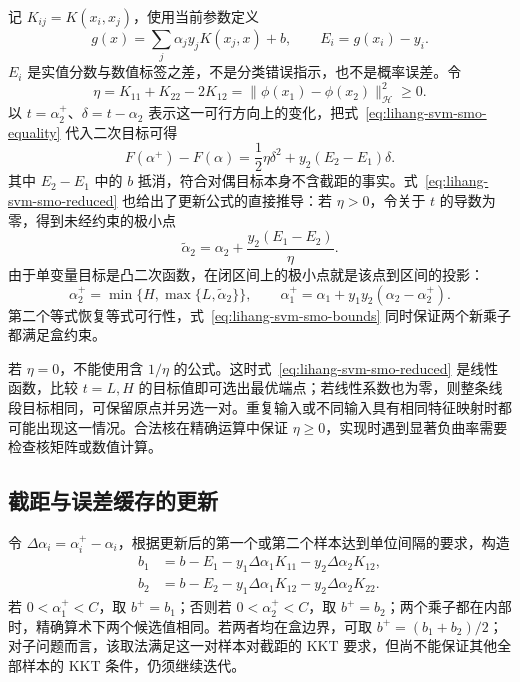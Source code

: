 记 $K_{ij}=K(x_i,x_j)$，使用当前参数定义
\begin{equation}
  g(x)=\sum_j\alpha_j y_jK(x_j,x)+b,
  \qquad E_i=g(x_i)-y_i.
  \label{eq:lihang-svm-smo-error}
\end{equation}
$E_i$ 是实值分数与数值标签之差，不是分类错误指示，也不是概率误差。令
\begin{equation}
  \eta=K_{11}+K_{22}-2K_{12}
       =\lVert\phi(x_1)-\phi(x_2)\rVert_{\mathcal H}^2\ge0.
  \label{eq:lihang-svm-smo-curvature}
\end{equation}
以 $t=\alpha_2^+$、$\delta=t-\alpha_2$ 表示这一可行方向上的变化，把式~\eqref{eq:lihang-svm-smo-equality} 代入二次目标可得
\begin{equation}
  F(\alpha^+)-F(\alpha)
      =\frac12\eta\delta^2+y_2(E_2-E_1)\delta.
  \label{eq:lihang-svm-smo-reduced}
\end{equation}
其中 $E_2-E_1$ 中的 $b$ 抵消，符合对偶目标本身不含截距的事实。式~\eqref{eq:lihang-svm-smo-reduced} 也给出了更新公式的直接推导：若 $\eta>0$，令关于 $t$ 的导数为零，得到未经约束的极小点
\[
  \widetilde\alpha_2=\alpha_2+\frac{y_2(E_1-E_2)}{\eta}.
\]
由于单变量目标是凸二次函数，在闭区间上的极小点就是该点到区间的投影：
\begin{equation}
  \alpha_2^+=\min\{H,\max\{L,\widetilde\alpha_2\}\},
  \qquad
  \alpha_1^+=\alpha_1+y_1y_2(\alpha_2-\alpha_2^+).
  \label{eq:lihang-svm-smo-update}
\end{equation}
第二个等式恢复等式可行性，式~\eqref{eq:lihang-svm-smo-bounds} 同时保证两个新乘子都满足盒约束。

若 $\eta=0$，不能使用含 $1/\eta$ 的公式。这时式~\eqref{eq:lihang-svm-smo-reduced} 是线性函数，比较 $t=L,H$ 的目标值即可选出最优端点；若线性系数也为零，则整条线段目标相同，可保留原点并另选一对。重复输入或不同输入具有相同特征映射时都可能出现这一情况。合法核在精确运算中保证 $\eta\ge0$，实现时遇到显著负曲率需要检查核矩阵或数值计算。

\subsection{截距与误差缓存的更新}

令 $\Delta\alpha_i=\alpha_i^+-\alpha_i$，根据更新后的第一个或第二个样本达到单位间隔的要求，构造
\begin{align}
  b_1&=b-E_1-y_1\Delta\alpha_1K_{11}
                   -y_2\Delta\alpha_2K_{12},\\
  b_2&=b-E_2-y_1\Delta\alpha_1K_{12}
                   -y_2\Delta\alpha_2K_{22}.
  \label{eq:lihang-svm-smo-b-candidates}
\end{align}
若 $0<\alpha_1^+<C$，取 $b^+=b_1$；否则若 $0<\alpha_2^+<C$，取 $b^+=b_2$；两个乘子都在内部时，精确算术下两个候选值相同。若两者均在盒边界，可取 $b^+=(b_1+b_2)/2$；对子问题而言，该取法满足这一对样本对截距的 KKT 要求，但尚不能保证其他全部样本的 KKT 条件，仍须继续迭代。

